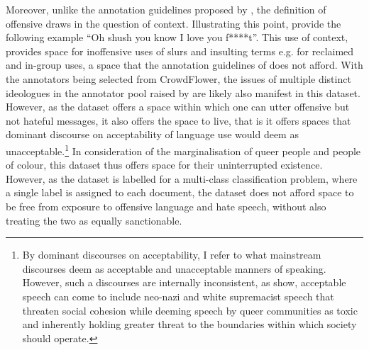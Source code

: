 Moreover, unlike the annotation guidelines proposed by \citet{Waseem-Hovy:2016}, the definition of offensive draws in the question of context. 
Illustrating this point, \citet{Davidson:2017} provide the following example ``Oh shush you know I love you f****t''. 
This use of context, provides space for inoffensive uses of slurs and insulting terms e.g. for reclaimed and in-group uses, a space that the annotation guidelines of \citet{Waseem-Hovy:2016} does not afford.
With the annotators being selected from CrowdFlower, the issues of multiple distinct ideologues in the annotator pool raised by \citet{Waseem:2016} are likely also manifest in this dataset.
However, as the dataset offers a space within which one can utter offensive but not hateful messages, it also offers the space to live, that is it offers spaces that dominant discourse on acceptability of language use would deem as unacceptable.\footnote{By dominant discourses on acceptability, I refer to what mainstream discourses deem as acceptable and unacceptable manners of speaking. However, such a discourses are internally inconsistent, as \citet{Dias:2021} show, acceptable speech can come to include neo-nazi and white supremacist speech that threaten social cohesion while deeming speech by queer communities as toxic and inherently holding greater threat to the boundaries within which society should operate.}
In consideration of the marginalisation of queer people and people of colour, this dataset thus offers space for their uninterrupted existence. 
However, as the dataset is labelled for a multi-class classification problem, where a single label is assigned to each document, the dataset does not afford space to be free from exposure to offensive language and hate speech, without also treating the two as equally sanctionable.

